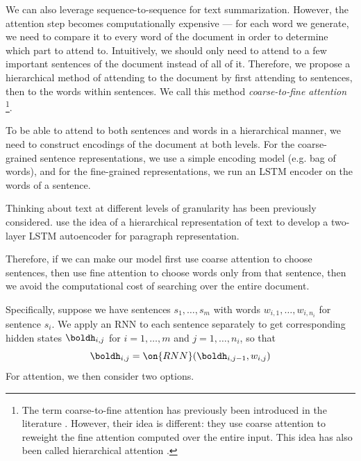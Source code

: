 \documentclass[12pt]{report}
\begin{document}
We can also leverage sequence-to-sequence for text summarization. However, the attention step becomes computationally expensive --- for each word we generate, we need to compare it to every word of the document in order to determine which part to attend to. Intuitively, we should only need to attend to a few important sentences of the document instead of all of it. Therefore, we propose a hierarchical method of attending to the document by first attending to sentences, then to the words within sentences. We call this method \emph{coarse-to-fine attention}
\footnote{The term coarse-to-fine attention has previously been introduced in the literature \citep{mei2016}. However, their idea is different: they use coarse attention to reweight the fine attention computed over the entire input. This idea has also been called hierarchical attention \citep{nallapati2016seq2seq}.}.



To be able to attend to both sentences and words in a hierarchical manner, we need to construct encodings of the document at both levels. For the coarse-grained sentence representations, we use a simple encoding model (e.g. bag of words), and for the fine-grained representations, we run an LSTM encoder on the words of a sentence.

Thinking about text at different levels of granularity has been previously considered. \citet{li2015autoencoder} use the idea of a hierarchical representation of text to develop a two-layer LSTM autoencoder for paragraph representation.


Therefore, if we can make our model first use coarse attention to choose sentences, then use fine attention to choose words only from that sentence, then we avoid the computational cost of searching over the entire document.

Specifically, suppose we have sentences $s_1, \ldots, s_m$ with words $w_{i,1}, \ldots, w_{i,n_i}$ for sentence $s_i$. We apply an RNN to each sentence separately to get corresponding hidden states $\boldh_{i,j}$ for $i = 1, \ldots, m$ and $j = 1, \ldots, n_i$, so that
\begin{equation}
\boldh_{i,j} = \on{RNN}(\boldh_{i,j-1}, w_{i,j})
\end{equation}
For attention, we then consider two options.
\end{document}
